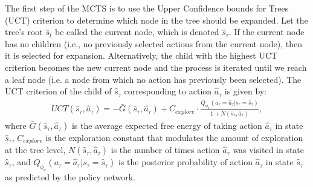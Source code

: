 \documentclass[twoside,11pt]{article}
\begin{document}
The first step of the MCTS is to use the Upper Confidence bounds for Trees (UCT) criterion to determine which node in the tree should be expanded. Let the tree's root $\hat{s}_t$ be called the current node, which is denoted $\hat{s}_\tau$. If the current node has no children (i.e., no previously selected actions from the current node), then it is selected for expansion. Alternatively, the child with the highest UCT criterion becomes the new current node and the process is iterated until we reach a leaf node (i.e. a node from which no action has previously been selected). The UCT criterion \citep{MCTS} of the child of $\hat{s}_\tau$ corresponding to action $\hat{a}_\tau$ is given by:
\begin{align*}
UCT(\hat{s}_\tau,\hat{a}_\tau) = - \bar{G}(\hat{s}_\tau,\hat{a}_\tau) + C_{explore} \cdot \frac{Q_{\phi_a}(a_\tau=\hat{a}_\tau|s_\tau=\hat{s}_\tau)}{1 + N(\hat{s}_\tau,\hat{a}_\tau)},
\end{align*}
where $\bar{G}(\hat{s}_\tau,\hat{a}_\tau)$ is the average expected free energy of taking action $\hat{a}_\tau$ in state $\hat{s}_\tau$, $C_{explore}$ is the exploration constant that modulates the amount of exploration at the tree level, $N(\hat{s}_\tau,\hat{a}_\tau)$ is the number of times action $\hat{a}_\tau$ was visited in state $\hat{s}_\tau$, and $Q_{\phi_a}(a_\tau=\hat{a}_\tau|s_\tau=\hat{s}_\tau)$ is the posterior probability of action $\hat{a}_\tau$ in state $\hat{s}_\tau$ as predicted by the policy network.
\end{document}

